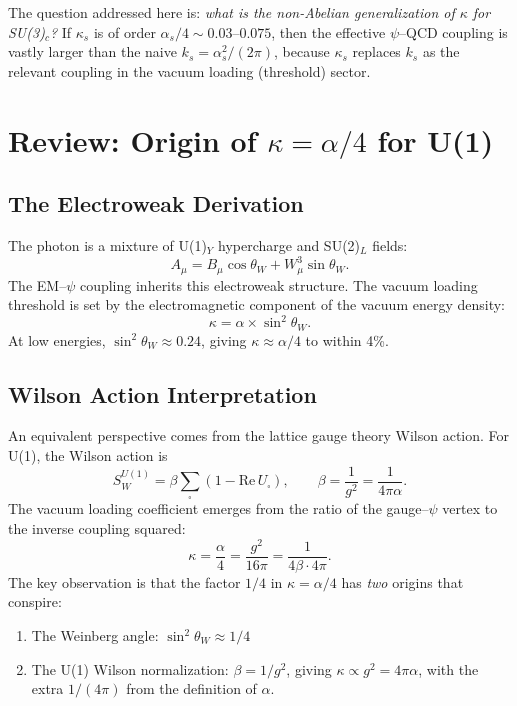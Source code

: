 \documentclass[11pt,letterpaper]{article}
\newcommand{\alphafine}{\alpha}
\theoremstyle{definition}
\begin{document}
The question addressed here is: \emph{what is the non-Abelian
generalization of $\kappa$ for SU(3)$_c$?}  If $\kappa_s$ is of
order $\alpha_s/4 \sim 0.03$--$0.075$, then the effective
$\psi$--QCD coupling is vastly larger than the naive
$k_s = \alpha_s^2/(2\pi)$, because $\kappa_s$ replaces $k_s$ as the
relevant coupling in the vacuum loading (threshold) sector.

\section{Review: Origin of $\kappa = \alpha/4$ for U(1)}\label{sec:review-U1}

\subsection{The Electroweak Derivation}

The photon is a mixture of U(1)$_Y$ hypercharge and SU(2)$_L$ fields:
\begin{equation}
A_\mu = B_\mu \cos\theta_W + W^3_\mu \sin\theta_W.
\end{equation}
The EM--$\psi$ coupling inherits this electroweak structure.  The
vacuum loading threshold is set by the electromagnetic component of
the vacuum energy density:
\begin{equation}
\kappa = \alphafine \times \sin^2\theta_W.
\end{equation}
At low energies, $\sin^2\theta_W \approx 0.24$, giving
$\kappa \approx \alphafine/4$ to within 4\%.

\subsection{Wilson Action Interpretation}\label{sec:wilson-U1}

An equivalent perspective comes from the lattice gauge theory Wilson
action.  For U(1), the Wilson action is
\begin{equation}
S_W^{U(1)} = \beta \sum_{\square} \left(1 - \mathrm{Re}\, U_\square\right),
\qquad \beta = \frac{1}{g^2} = \frac{1}{4\pi\alphafine}.
\end{equation}
The vacuum loading coefficient emerges from the ratio of the
gauge--$\psi$ vertex to the inverse coupling squared:
\begin{equation}\label{eq:kappa-wilson-U1}
\kappa = \frac{\alpha}{4} = \frac{g^2}{16\pi} = \frac{1}{4\beta \cdot 4\pi}.
\end{equation}
The key observation is that the factor $1/4$ in $\kappa = \alpha/4$
has \emph{two} origins that conspire:
\begin{enumerate}
\item The Weinberg angle: $\sin^2\theta_W \approx 1/4$
\item The U(1) Wilson normalization: $\beta = 1/g^2$, giving
$\kappa \propto g^2 = 4\pi\alpha$, with the extra $1/(4\pi)$
from the definition of $\alpha$.
\end{enumerate}
\end{document}
